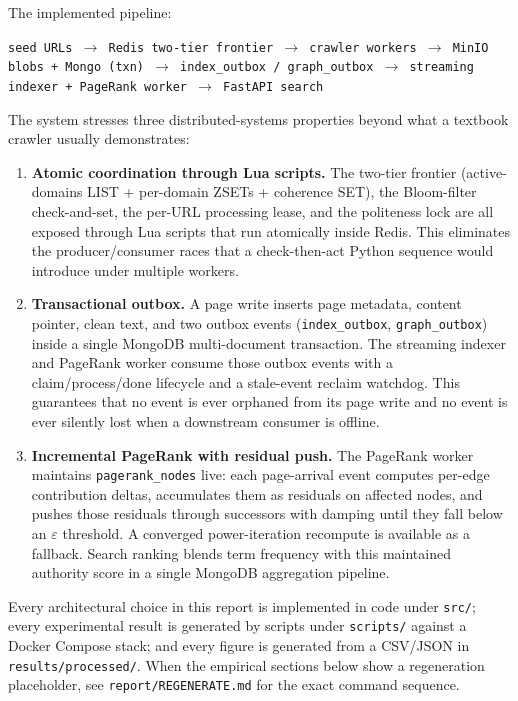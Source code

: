 \documentclass[11pt,a4paper]{article}
\newcommand{\code}[1]{\texttt{#1}}
\begin{document}
The implemented pipeline:

\begin{center}
\code{seed URLs $\to$ Redis two-tier frontier $\to$ crawler workers $\to$ MinIO blobs + Mongo (txn) $\to$ index\_outbox / graph\_outbox $\to$ streaming indexer + PageRank worker $\to$ FastAPI search}
\end{center}

The system stresses three distributed-systems properties beyond what a textbook crawler usually demonstrates:

\begin{enumerate}
  \item \textbf{Atomic coordination through Lua scripts.} The two-tier frontier (active-domains LIST + per-domain ZSETs + coherence SET), the Bloom-filter check-and-set, the per-URL processing lease, and the politeness lock are all exposed through Lua scripts that run atomically inside Redis. This eliminates the producer/consumer races that a check-then-act Python sequence would introduce under multiple workers.
  \item \textbf{Transactional outbox.} A page write inserts page metadata, content pointer, clean text, and two outbox events (\code{index\_outbox}, \code{graph\_outbox}) inside a single MongoDB multi-document transaction. The streaming indexer and PageRank worker consume those outbox events with a claim/process/done lifecycle and a stale-event reclaim watchdog. This guarantees that no event is ever orphaned from its page write and no event is ever silently lost when a downstream consumer is offline.
  \item \textbf{Incremental PageRank with residual push.} The PageRank worker maintains \code{pagerank\_nodes} live: each page-arrival event computes per-edge contribution deltas, accumulates them as residuals on affected nodes, and pushes those residuals through successors with damping until they fall below an $\varepsilon$ threshold. A converged power-iteration recompute is available as a fallback. Search ranking blends term frequency with this maintained authority score in a single MongoDB aggregation pipeline.
\end{enumerate}

Every architectural choice in this report is implemented in code under \code{src/}; every experimental result is generated by scripts under \code{scripts/} against a Docker Compose stack; and every figure is generated from a CSV/JSON in \code{results/processed/}. When the empirical sections below show a regeneration placeholder, see \code{report/REGENERATE.md} for the exact command sequence.
\end{document}
